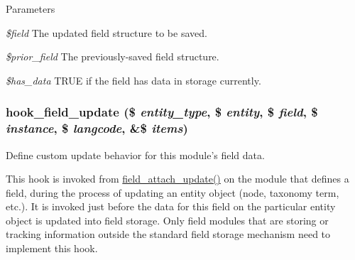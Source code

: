 \begin{DoxyParams}{Parameters}
\item[{\em \$field}]The updated field structure to be saved. \item[{\em \$prior\_\-field}]The previously-\/saved field structure. \item[{\em \$has\_\-data}]TRUE if the field has data in storage currently. \end{DoxyParams}
\hypertarget{group__field__types_gaca5bc4f8ab69818f23783af24454d9c4}{
\subsubsection[{hook\_\-field\_\-update}]{\setlength{\rightskip}{0pt plus 5cm}hook\_\-field\_\-update (\$ {\em entity\_\-type}, \/  \$ {\em entity}, \/  \$ {\em field}, \/  \$ {\em instance}, \/  \$ {\em langcode}, \/  \&\$ {\em items})}}
\label{group__field__types_gaca5bc4f8ab69818f23783af24454d9c4}
Define custom update behavior for this module's field data.

This hook is invoked from \hyperlink{group__field__attach_ga8d15efdca36306ea04552bed4986e77b}{field\_\-attach\_\-update()} on the module that defines a field, during the process of updating an entity object (node, taxonomy term, etc.). It is invoked just before the data for this field on the particular entity object is updated into field storage. Only field modules that are storing or tracking information outside the standard field storage mechanism need to implement this hook.



